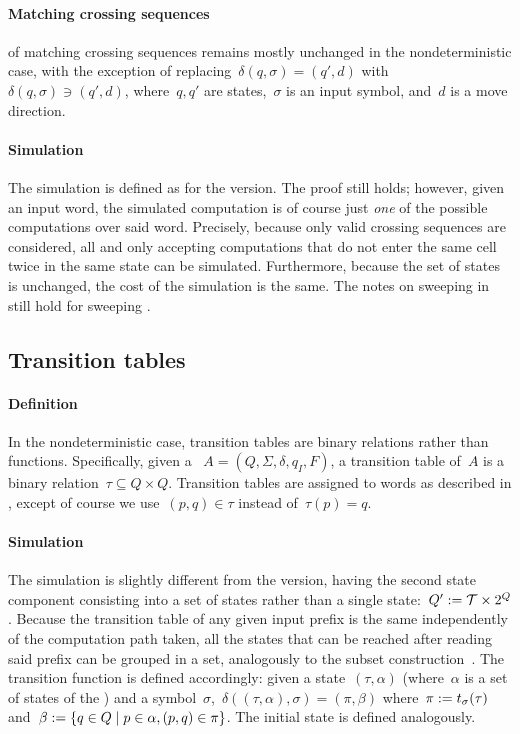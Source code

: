 \paragraph{Matching crossing sequences}  of matching crossing sequences remains mostly unchanged in the nondeterministic case, with the exception of replacing~$\delta(q,\sigma)=(q',d)$ with~$\delta(q,\sigma)\ni(q',d)$, where~$q,q'$ are states,~$\sigma$ is an input symbol, and~$d$ is a move direction.

\paragraph{Simulation} The simulation is defined as for the \TDFA version.
The proof still holds; however, given an input word, the simulated computation is of course just \emph{one} of the possible computations over said word.
Precisely, because only valid crossing sequences are considered, all and only accepting computations that do not enter the same cell twice in the same state can be simulated.
Furthermore, because the set of states is unchanged, the cost of the simulation is the same.
The notes on sweeping \TDFAs in  still hold for sweeping \TNFAs.


\subsection{Transition tables}

\paragraph{Definition} In the nondeterministic case, transition tables are binary relations rather than functions.
Specifically, given a \TNFA~$A=(Q,\Sigma,\delta,q_I,F)$, a transition table of~$A$ is a binary relation~$\tau\subseteq Q\times Q$.
Transition tables are assigned to words as described in , except of course we use~$(p,q)\in\tau$ instead of~$\tau(p)=q$.

\paragraph{Simulation} The simulation is slightly different from the \TDFA version, having the second state component consisting into a set of states rather than a single state:~$Q':=\mathcal T\times2^{Q}$.
Because the transition table of any given input prefix is the same independently of the computation path taken, all the states that can be reached after reading said prefix can be grouped in a set, analogously to the subset construction~\cite{RabSco59,HopUll79}.
The transition function is defined accordingly: given a state~$(\tau,\alpha)$ (where~$\alpha$ is a set of states of the \TNFA) and a symbol~$\sigma$,~$\delta((\tau,\alpha),\sigma)=(\pi,\beta)$ where~$\pi:=t_\sigma(\tau)$ and~$\beta:=\{q\in Q\mid p\in\alpha, (p,q)\in\pi\}$.
The initial state is defined analogously.

